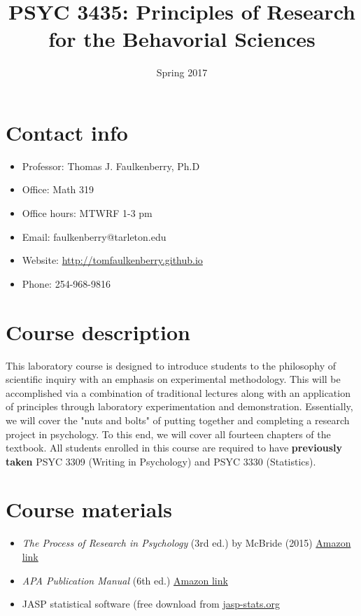 \documentclass[10pt]{article}
\date{Spring 2017}
\title{PSYC 3435: Principles of Research for the Behavorial Sciences}
\begin{document}
\maketitle

\section*{Contact info}
\label{sec-1}
\begin{itemize}
\item Professor: Thomas J. Faulkenberry, Ph.D
\item Office: Math 319
\item Office hours: MTWRF 1-3 pm
\item Email: faulkenberry@tarleton.edu
\item Website: \url{http://tomfaulkenberry.github.io}
\item Phone: 254-968-9816
\end{itemize}

\section*{Course description}
\label{sec-2}

This laboratory course is designed to introduce students to the philosophy of 
scientific inquiry with an emphasis on experimental methodology. This will be 
accomplished via a combination of traditional lectures along with an application 
of principles through laboratory experimentation and demonstration. Essentially, 
we will cover the "nuts and bolts" of putting together and completing a research 
project in psychology. To this end, we will cover all fourteen chapters of the 
textbook. All students enrolled in this course are required to have 
\textbf{previously taken} PSYC 3309 (Writing in Psychology) and PSYC 3330 (Statistics). 

\section*{Course materials}
\label{sec-3}

\begin{itemize}
\item \emph{The Process of Research in Psychology} (3rd ed.) by McBride (2015) \href{https://www.amazon.com/Process-Research-Psychology-Dawn-McBride/dp/1483347605/}{Amazon link}
\item \emph{APA Publication Manual} (6th ed.) \href{http://www.amazon.com/Publication-Manual-American-Psychological-Association/dp/1433805618/}{Amazon link}
\item JASP statistical software (free download from \href{http://jasp-stats.org}{jasp-stats.org}
\end{itemize}
\end{document}
